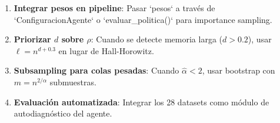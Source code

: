 \documentclass[12pt,a4paper]{article}
\begin{document}
\begin{enumerate}
	\item \textbf{Integrar pesos en pipeline}: Pasar `pesos` a través de `ConfiguracionAgente` o `evaluar_politica()` para importance sampling.
	\item \textbf{Priorizar $d$ sobre $\rho$}: Cuando se detecte memoria larga ($d > 0.2$), usar $\ell = n^{d+0.3}$ en lugar de Hall-Horowitz.
	\item \textbf{Subsampling para colas pesadas}: Cuando $\hat{\alpha} < 2$, usar bootstrap con $m = n^{2/\alpha}$ submuestras.
	\item \textbf{Evaluación automatizada}: Integrar los 28 datasets como módulo de autodiagnóstico del agente.
\end{enumerate}
\end{document}
